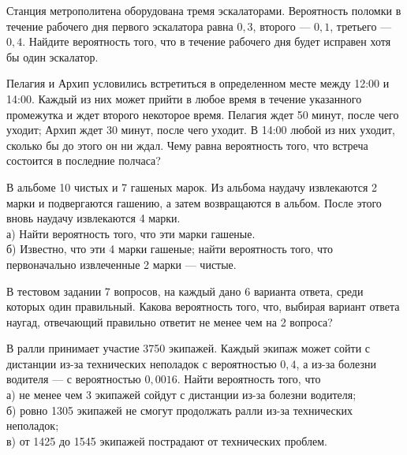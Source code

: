 \newpage\setcounter{zad}{0}



\begin{zkrW}{20}\noindent 
	Станция метрополитена оборудована тремя эскалаторами. Вероятность поломки в течение рабочего дня первого эскалатора равна $0{,}3$, второго --- $0{,}1$, третьего ---  $0{,}4$. Найдите вероятность того, что в течение рабочего дня будет исправен хотя бы один эскалатор.
 
\end{zkrW}

\begin{zkrW}{20}\noindent 
	Пелагия и Архип условились встретиться в определенном месте между 12:00 и 14:00. Каждый из них может прийти в любое время в течение указанного промежутка и ждет второго некоторое время. Пелагия ждет 50 минут, после чего уходит; Архип ждет 30 минут, после чего уходит. В 14:00 любой из них уходит, сколько бы до этого он ни ждал. Чему равна вероятность того, что встреча состоится в последние полчаса?
 
\end{zkrW}

\begin{zkrW}{20}\noindent 
	В альбоме 10 чистых и 7 гашеных марок. Из альбома наудачу извлекаются 2 марки и подвергаются гашению, а затем возвращаются в альбом. После этого вновь наудачу извлекаются 4 марки. \\ \indent а) Найти вероятность того, что эти марки гашеные. \\ \indent б) Известно, что эти 4 марки гашеные; найти вероятность того, что первоначально извлеченные 2 марки --- чистые.
 
\end{zkrW}

\begin{zkrW}{20}\noindent 
	В тестовом задании 7 вопросов, на каждый дано 6 варианта ответа, среди которых один правильный. Какова вероятность того, что, выбирая вариант ответа наугад, отвечающий правильно ответит не менее чем на 2 вопроса?
 
\end{zkrW}

\begin{zkrW}{20}\noindent 
	В ралли принимает участие 3750 экипажей. Каждый экипаж может сойти с дистанции из-за технических неполадок с вероятностью $0{,}4$, а из-за болезни водителя --- с вероятностью $0{,}0016$. Найти вероятность того, что \\ \indent а) не менее чем 3 экипажей сойдут с дистанции из-за болезни водителя; \\ \indent б) ровно 1305 экипажей не смогут продолжать ралли из-за технических неполадок; \\ \indent в) от 1425 до 1545 экипажей пострадают от технических проблем.
 
\end{zkrW}

